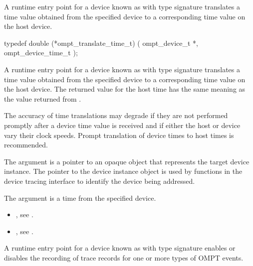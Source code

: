 \label{sec:ompt_translate_time_t}

\summary
A runtime entry point for a device known
as 
with type signature  translates
a time value obtained from the specified device to a corresponding time
value on the host device.

\format
\begin{ccppspecific}
\begin{omptInquiry}
typedef double (*ompt_translate_time_t) (
  ompt_device_t *,
  ompt_device_time_t 
);
\end{omptInquiry}
\end{ccppspecific}

\descr
A runtime entry point for a device known as 
with type signature  translates
a time value obtained from the specified device to a corresponding time
value on the host device. The returned value for the host time has
the same meaning as the value returned from .

\begin{note}
The accuracy of time translations may degrade if they are not
performed promptly after a device time value is received and if either
the host or device vary their clock speeds. Prompt translation of
device times to host times is recommended.
\end{note}

\argdesc

The argument  is a pointer to an opaque object that
represents the target device instance. The pointer to the device
instance object is used by functions in the device tracing interface
to identify the device being addressed.

The argument  is a time from the specified device.

\crossreferences
\begin{itemize}
\item {},
see .
\item {},
see .
\end{itemize}

\label{sec:ompt_set_trace_ompt_t}

\summary
A runtime entry point for a device known as 
with type signature 
enables or disables the recording of trace records for one or more
types of OMPT events.

